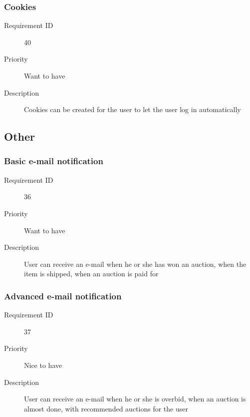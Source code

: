 		\subsubsection{Cookies}
			\begin{description}
				\item[Requirement ID] 40
				\item[Priority] Want to have
				\item[Description] Cookies can be created for the user to let the user log in 
					automatically
			\end{description}
	\subsection{Other}
		\subsubsection{Basic e-mail notification}
			\begin{description}
				\item[Requirement ID] 36
				\item[Priority] Want to have
				\item[Description] User can receive an e-mail when he or she has won an auction,
					when the item is shipped, when an auction is paid for
			\end{description}
		\subsubsection{Advanced e-mail notification}
			\begin{description}
				\item[Requirement ID] 37
				\item[Priority] Nice to have
				\item[Description] User can receive an e-mail when he or she is overbid,
					when an auction is almost done, with recommended auctions for the user
			\end{description}